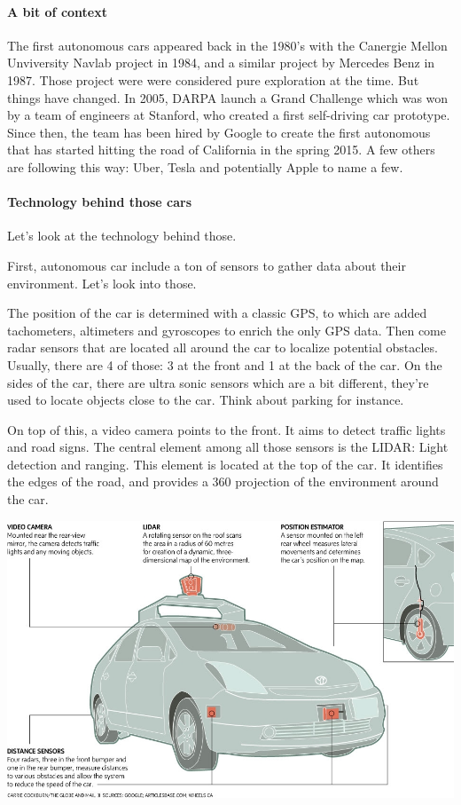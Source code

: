 \documentclass[12pt]{article}
\begin{document}
\paragraph{A bit of context}

The first autonomous cars appeared back in the 1980's with the Canergie Mellon
Unviversity Navlab project in 1984, and a similar project by Mercedes Benz in
1987. Those project were were considered pure exploration at the time.
But things have changed. In 2005, DARPA launch a Grand Challenge which was won
by a team of engineers at Stanford, who created a first self-driving car
prototype. Since then, the team has been hired by Google to create the first
autonomous that has started hitting the road of California in the spring 2015.
A few others are following this way: Uber, Tesla and potentially Apple to name
a few.

\paragraph{Technology behind those cars}

Let's look at the technology behind those.

First, autonomous car include a ton of sensors to gather data about their
environment. Let's look into those.

The position of the car is determined with a classic GPS, to which are added
tachometers, altimeters and gyroscopes to enrich the only GPS data. Then come
radar sensors that are located all around the car to localize potential
obstacles. Usually, there are 4 of those: 3 at the front and 1 at the back of
the car. On the sides of the car, there are ultra sonic sensors which are a bit
different, they're used to locate objects close to the car. Think about parking
for instance.

\noindent On top of this, a video camera points to the front. It aims to detect
traffic lights and road signs. The central element among all those sensors is
the LIDAR: Light detection and ranging. This element is located at the top of
the car. It identifies the edges of the road, and provides a 360 projection of
the environment around the car.

\smallskip
\includegraphics[width=\textwidth]{car-diagram}
\smallskip
\end{document}
